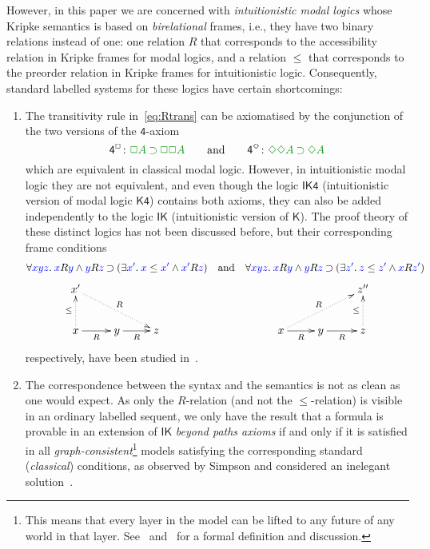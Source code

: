 \documentclass[a4paper]{article}
\theoremstyle{plain}
\theoremstyle{definition}
\newcommand{\quand}{\quad\mbox{and}\quad}
\newcommand{\qquand}{\qquad\mbox{and}\qquad}
\newcommand{\quadcm}{\rlap{\quad,}}
\newcommand*{\ax}[1]{\mathsf{#1}}
\newcommand{\fourax}{\ax{4}}
\newcommand*{\IK}{\mathsf{IK}}
\newcommand*{\K}{\mathsf{K}}
\newcommand*{\IKfour}{\mathsf{IK4}}
\newcommand*{\Kfour}{\mathsf{K4}}
\newcommand*{\AND}{\mathbin{\wedge}}
\newcommand*{\IMP}{\mathbin{\supset}}%
\newcommand*{\BOX}{\mathord{\Box}}
\newcommand*{\DIA}{\mathord{\Diamond}}
\newcommand*{\fm}[1]{{\color{notgreen}{#1}}}
\newcommand*{\lb}[1]{{\color{blue}{#1}}}
\newcommand*{\accs}[2]{\lb{#1}R\lb{#2}}
\newcommand*{\futs}[2]{\lb{#1}\le{\lb{#2}}}
\newcommand*{\rn}[1]  {\ensuremath{\mathsf{#1}}}
\begin{document}
 However,
 in this paper we are concerned with \emph{intuitionistic modal
 	logics} whose Kripke semantics is based on \emph{birelational}
 frames, i.e., they have two binary relations instead of one: one
 relation $R$ that corresponds to the accessibility relation in 
 Kripke frames for modal logics, and a relation $\le$ that
 corresponds to the preorder relation in Kripke frames for
 intuitionistic logic. Consequently, standard labelled systems for
 these logics have certain shortcomings:
 \begin{enumerate}
 	\item The transitivity rule in~\eqref{eq:Rtrans} can be axiomatised by the conjunction of the two
 	versions of the $\fourax$-axiom
 	\begin{equation}
 	\label{eq:4ax}
 	\ax{4^{\BOX}}\colon\fm{\BOX A\IMP \BOX\BOX A}
 	\qquand
 	\rn{4^{\DIA}}\colon\fm{\DIA\DIA A\IMP\DIA A}
 	\end{equation}
 	which are equivalent in classical
 	modal logic. However, in intuitionistic modal logic they are not
 	equivalent, and even though the logic $\IKfour$ 
 	(intuitionistic version of modal logic $\Kfour$) contains both
 	axioms, they can also be added independently to the logic $\IK$ 
 	(intuitionistic version of $\K$). The proof theory of these
 	distinct logics has not been discussed before, but their
 	corresponding frame conditions
 	\begin{equation}
 	\label{eq:4frame}
 	\forall\lb{xyz}.\:\accs xy\AND \accs yz\IMP(\exists\lb{x'}.\:\futs x{x'}\AND\accs {x'}z)
 	\quand
 	\forall\lb{xyz}.\:\accs xy\AND \accs yz\IMP(\exists\lb{z'}.\:\futs z{z'}\AND\accs {x}{z'})
 	\;
 	\end{equation}
 	$$
 	\xymatrix{
 		x' \ar@{.>}[drr]^R \\
 		x \ar@{.>}[u]^\le \ar@{->}[r]_{R} & y \ar@{->}[r]_{R} & z
 	}
 	\hskip10em
 	\xymatrix{
 		&& z''  \\
 		x  \ar@{.>}[urr]^R \ar@{->}[r]_{R} & y \ar@{->}[r]_{R} & z \ar@{.>}[u]^\le
 	}
 	$$
 	respectively, have been studied in~\cite{plotkin:stirling:86}.
 	\item The correspondence between the syntax and the semantics is not
 	as clean as one would expect. As only the $R$-relation (and not the
 	$\le$-relation) is visible in an ordinary labelled
 	sequent, we only have the result that a formula is provable in an extension of $\IK$ \emph{beyond paths axioms }
 	if and only if it is satisfied in all \emph{graph-consistent}\footnote{This
 		means that every layer in the model can be lifted to any future of
 		any world in that layer. See~\cite{simpson:phd} and~\cite{mar:str:tableaux17} for a formal definition and discussion.}   
 	models satisfying the corresponding standard (\emph{classical}) conditions, as observed by Simpson	and considered an inelegant solution~\cite{simpson:phd}.
 \end{enumerate}
\end{document}
